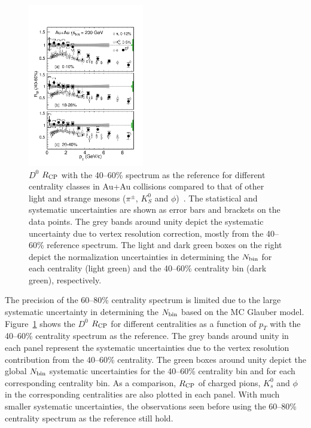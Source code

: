 \documentclass[%
 reprint,	
showpacs,
 amsmath,amssymb,
 aps,
 prc,
]{revtex4-1}
\begin{document}
\begin{figure}
\centering
\includegraphics[width=0.45\textwidth]{fig/D0_Rcp2.pdf}
\caption{$D^{0}$ $R_{\rm CP}$ with the 40--60\% spectrum as the reference for different centrality classes in Au+Au collisions compared to that of other light and strange mesons ($\pi^{\pm}$, $K^0_{S}$ and $\phi$)~\cite{Adams2006_Identified,Abelev2009,Agakishiev2012}. The statistical and systematic uncertainties are shown as error bars and brackets on the data points. The grey bands around unity depict the systematic uncertainty due to vertex resolution correction, mostly from the 40--60\% reference spectrum. The light and dark green boxes on the right depict the normalization uncertainties in determining the $N_{\rm bin}$ for each centrality (light green) and the 40--60\% centrality bin (dark green), respectively.}
\label{fig:D0_Rcp2} 
\end{figure}

The precision of the 60--80\% centrality spectrum is limited due to the large systematic uncertainty in determining the $N_{\rm bin}$ based on the MC Glauber model. Figure~\ref{fig:D0_Rcp2} shows the $D^0$ $R_{\rm CP}$ for different centralities as a function of $p_{T}$ with the 40--60\% centrality spectrum as the reference. The grey bands around unity in each panel represent the systematic uncertainties due to the vertex resolution contribution from the 40--60\% centrality. The green boxes around unity depict the global $N_{\rm bin}$ systematic uncertainties for the 40--60\% centrality bin and for each corresponding centrality bin. As a comparison, $R_{\rm CP}$ of charged pions, $K_{s}^{0}$ and $\phi$ in the corresponding centralities are also plotted in each panel. With much smaller systematic uncertainties, the observations seen before using the 60--80\% centrality spectrum as the reference still hold. 
\end{document}
